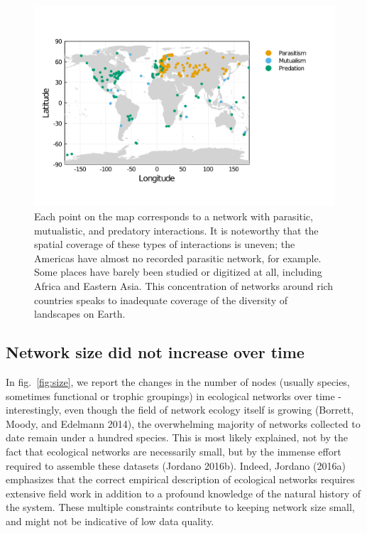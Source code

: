 \documentclass[10pt,oneside]{article}
\makeatletter
\def\maxwidth{\ifdim\Gin@nat@width>\linewidth\linewidth
\else\Gin@nat@width\fi}
\let\Oldincludegraphics\includegraphics
\renewcommand{\includegraphics}[1]{\Oldincludegraphics[width=\maxwidth]{#1}}
\makeatother
\begin{document}
\begin{figure}
\hypertarget{fig:spatial}{%
\centering
\includegraphics{figures/map_networks_type.png}
\caption{Each point on the map corresponds to a network with parasitic,
mutualistic, and predatory interactions. It is noteworthy that the
spatial coverage of these types of interactions is uneven; the Americas
have almost no recorded parasitic network, for example. Some places have
barely been studied or digitized at all, including Africa and Eastern
Asia. This concentration of networks around rich countries speaks to
inadequate coverage of the diversity of landscapes on
Earth.}\label{fig:spatial}
}
\end{figure}

\hypertarget{network-size-did-not-increase-over-time}{%
\subsection{Network size did not increase over
time}\label{network-size-did-not-increase-over-time}}

In fig.~\ref{fig:size}, we report the changes in the number of nodes
(usually species, sometimes functional or trophic groupings) in
ecological networks over time - interestingly, even though the field of
network ecology itself is growing (Borrett, Moody, and Edelmann 2014),
the overwhelming majority of networks collected to date remain under a
hundred species. This is most likely explained, not by the fact that
ecological networks are necessarily small, but by the immense effort
required to assemble these datasets (Jordano 2016b). Indeed, Jordano
(2016a) emphasizes that the correct empirical description of ecological
networks requires extensive field work in addition to a profound
knowledge of the natural history of the system. These multiple
constraints contribute to keeping network size small, and might not be
indicative of low data quality.
\end{document}
